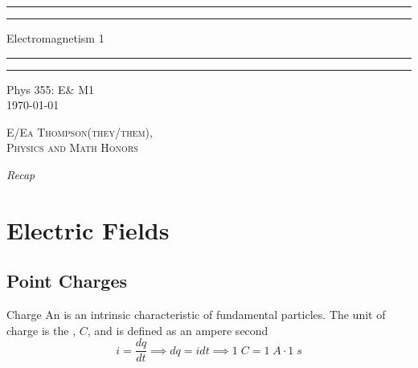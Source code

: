 \documentclass[12pt]{report}
\begin{document}

\begin{titlepage}
    \centering
    \scshape
    \vspace*{\baselineskip}
    \rule{\textwidth}{1.6pt}\vspace*{-\baselineskip}\vspace*{2pt}
    \rule{\textwidth}{0.4pt}
    
    \vspace{0.75\baselineskip}
    
    {\LARGE Electromagnetism 1}
    
    \vspace{0.75\baselineskip}
    
    \rule{\textwidth}{0.4pt}\vspace*{-\baselineskip}\vspace{3.2pt}
    \rule{\textwidth}{1.6pt}
    
    \vspace{2\baselineskip}
    Phys 355: E\& M1 \\
    \vspace*{3\baselineskip}
    \monthdayyeardate\today \\
    \vspace*{5.0\baselineskip}
    
    {\scshape\Large E/Ea Thompson(they/them), \\ Physics and Math Honors\\}
    
    \vspace{1.0\baselineskip}
    \textit{Recap}
\end{titlepage}

\tableofcontents


\chapter{Electric Fields}

\section{Point Charges}

\begin{defn}{Charge}{}
	An  is an intrinsic characteristic of fundamental particles. The unit of charge is the , $C$, and is defined as an ampere second \begin{equation}
		i = \frac{dq}{dt} \implies dq = idt \implies 1\;C = 1\;A\cdot 1\;s
	\end{equation}
\end{defn}
\end{document}
